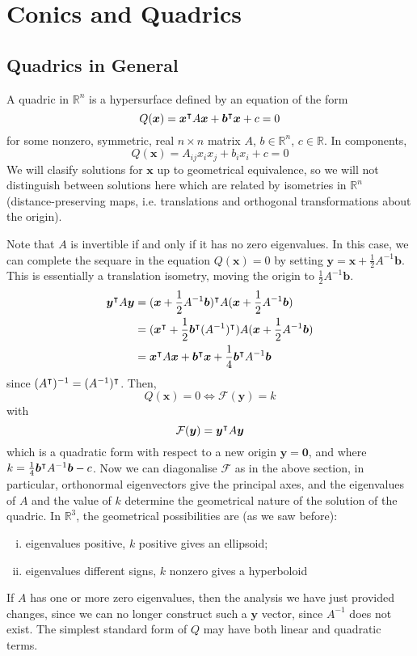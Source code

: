 \documentclass{article}
\begin{document}
	\section{Conics and Quadrics}
	\subsection{Quadrics in General}
	A quadric in $\mathbb R^n$ is a hypersurface defined by an equation of the form
	\[ Q(\bm x) = \bm x^\intercal A \bm x + \bm b^\intercal \bm x + c = 0 \]
	for some nonzero, symmetric, real $n \times n$ matrix $A$, $b \in \mathbb R^n$, $c \in \mathbb R$. In components,
	\[ Q(\bm x) = A_{ij}x_ix_j + b_ix_i + c = 0 \]
	We will clasify solutions for $\bm x$ up to geometrical equivalence, so we will not distinguish between solutions here which are related by isometries in $\mathbb R^n$ (distance-preserving maps, i.e. translations and orthogonal transformations about the origin).

	Note that $A$ is invertible if and only if it has no zero eigenvalues. In this case, we can complete the sequare in the equation $Q(\bm x) = 0$ by setting $\bm y = \bm x + \frac{1}{2}A^{-1} \bm b$. This is essentially a translation isometry, moving the origin to $\frac{1}{2}A^{-1} \bm b$.
	\begin{align*}
		\bm y^\intercal A \bm y &= (\bm x + \frac{1}{2}A^{-1}\bm b)^\intercal A (\bm x + \frac{1}{2}A^{-1}\bm b) \\
		&= (\bm x^\intercal + \frac{1}{2}\bm b^\intercal(A^{-1})^\intercal) A (\bm x + \frac{1}{2}A^{-1}\bm b) \\
		&= \bm x^\intercal A \bm x + \bm b^\intercal \bm x + \frac{1}{4}\bm b^\intercal A^{-1}\bm b
	\end{align*}
	since $(A^\intercal)^{-1} = (A^{-1})^\intercal$. Then,
	\[ Q(\bm x) = 0 \iff \mathcal F(\bm y) = k \]
	with
	\[ \mathcal F(\bm y) = \bm y^\intercal A \bm y \]
	which is a quadratic form with respect to a new origin $\bm y = \bm 0$, and where $k = \frac{1}{4}\bm b^\intercal A^{-1}\bm b - c$. Now we can diagonalise $\mathcal F$ as in the above section, in particular, orthonormal eigenvectors give the principal axes, and the eigenvalues of $A$ and the value of $k$ determine the geometrical nature of the solution of the quadric. In $\mathbb R^3$, the geometrical possibilities are (as we saw before):
	\begin{enumerate}[(i)]
		\item eigenvalues positive, $k$ positive gives an ellipsoid;
		\item eigenvalues different signs, $k$ nonzero gives a hyperboloid
	\end{enumerate}
	If $A$ has one or more zero eigenvalues, then the analysis we have just provided changes, since we can no longer construct such a $\bm y$ vector, since $A^{-1}$ does not exist. The simplest standard form of $Q$ may have both linear and quadratic terms.
\end{document}
